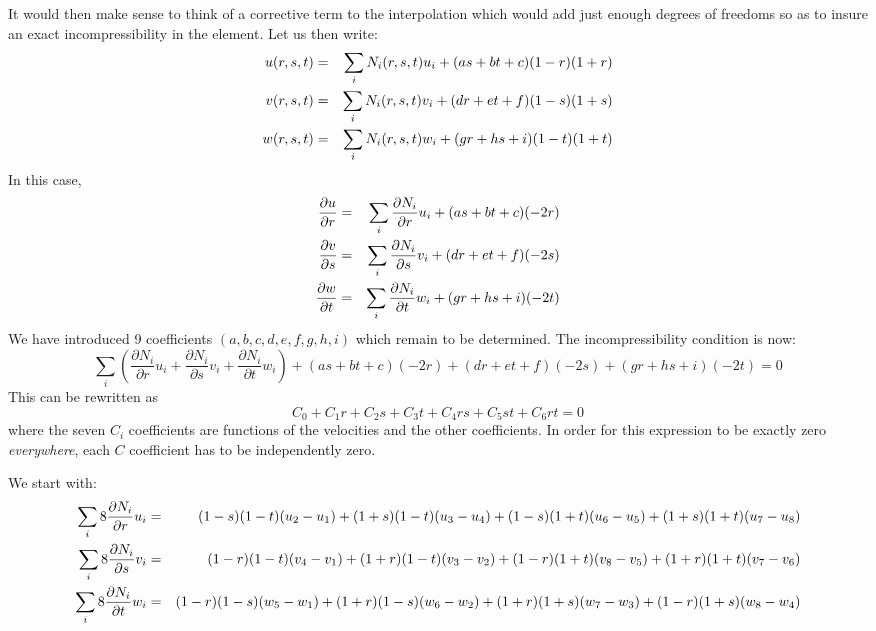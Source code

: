 It would then make sense to think of a corrective term to the interpolation
which would add just enough degrees of freedoms so as to insure an exact
incompressibility in the element.
Let us then write:
\begin{eqnarray}
u(r,s,t)&=&\sum_i N_i(r,s,t) u_i + (a s + b t +c)(1-r)(1+r) \nonumber\\
v(r,s,t)&=&\sum_i N_i(r,s,t) v_i + (d r + e t +f)(1-s)(1+s) \nonumber\\
w(r,s,t)&=&\sum_i N_i(r,s,t) w_i + (g r + h s +i)(1-t)(1+t) \nonumber
\end{eqnarray}
In this case,
\begin{eqnarray}
\frac{\partial u}{\partial r}&=&\sum_i \frac{\partial N_i}{\partial r} u_i + (a s + b t +c)(-2r)\nonumber\\
\frac{\partial v}{\partial s}&=&\sum_i \frac{\partial N_i}{\partial s} v_i + (d r + e t +f)(-2s)\nonumber\\
\frac{\partial w}{\partial t}&=&\sum_i \frac{\partial N_i}{\partial t} w_i + (g r + h s +i)(-2t)\nonumber
\end{eqnarray}
We have introduced 9 coefficients  $(a,b,c,d,e,f,g,h,i)$ which remain to be determined.
The incompressibility condition is now:
\[
\sum_i \left(  
\frac{\partial N_i}{\partial r} u_i+
\frac{\partial N_i}{\partial s} v_i+
\frac{\partial N_i}{\partial t} w_i
\right)
+ (a s + b t +c) (-2r) + (d r + e t +f)(-2s) + (g r + h s +i)(-2t) 
=0
\]
This can be rewritten as
\[
C_0  + C_1 r + C_2 s + C_3 t + C_4 rs + C_5 st + C_6 rt = 0
\]
where the seven $C_i$ coefficients are functions of the velocities and the other coefficients.
In order for this expression to be exactly zero {\it everywhere}, each $C$ coefficient has
to be independently zero.

We start with:
\begin{eqnarray}
\sum_i 8\frac{\partial N_i}{\partial r} u_i 
&=& (1-s)(1-t)(u_2-u_1)
+ (1+s)(1-t)(u_3-u_4)
+ (1-s)(1+t)(u_6-u_5)
+ (1+s)(1+t)(u_7-u_8) \nonumber\\
\sum_i 8\frac{\partial N_i}{\partial s} v_i 
&=& (1-r)(1-t)(v_4-v_1)
+ (1+r)(1-t)(v_3-v_2)
+ (1-r)(1+t)(v_8-v_5)
+ (1+r)(1+t)(v_7-v_6) \nonumber\\
\sum_i 8\frac{\partial N_i}{\partial t} w_i 
&=& (1-r)(1-s)(w_5-w_1)
+ (1+r)(1-s)(w_6-w_2)
+ (1+r)(1+s)(w_7-w_3)
+ (1-r)(1+s)(w_8-w_4) \nonumber
\end{eqnarray}

